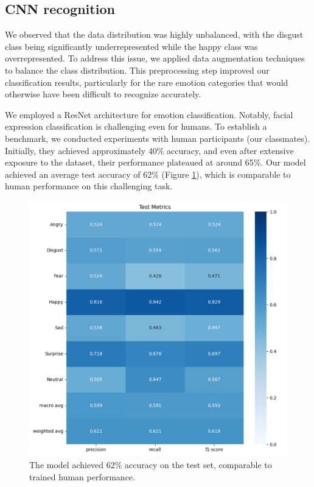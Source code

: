\subsection{CNN recognition}
We observed that the data distribution was highly unbalanced, with the disgust class being significantly underrepresented while the happy class was overrepresented. To address this issue, we applied data augmentation techniques to balance the class distribution. This preprocessing step improved our classification results, particularly for the rare emotion categories that would otherwise have been difficult to recognize accurately.

We employed a ResNet architecture for emotion classification. Notably, facial expression classification is challenging even for humans. To establish a benchmark, we conducted experiments with human participants (our classmates). Initially, they achieved approximately 40\% accuracy, and even after extensive exposure to the dataset, their performance plateaued at around 65\%. Our model achieved an average test accuracy of 62\% (Figure \ref{fig:test_acc}), which is comparable to human performance on this challenging task.

\begin{figure}[!htb]
	\centering
	 \includegraphics[width=1.0\linewidth]{sec/assets/test_acc.png}
	 \caption{The model achieved 62\% accuracy on the test set, comparable to trained human performance.}
	 \label{fig:test_acc}
\end{figure}

